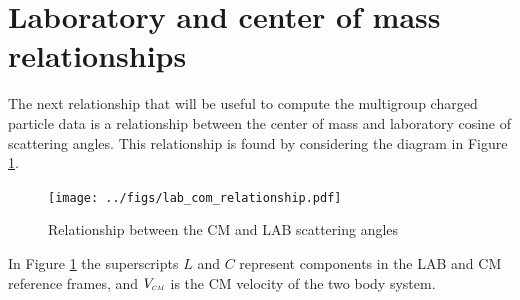 \documentclass[../main.tex]{subfiles}
\begin{document}
\section{Laboratory and center of mass relationships}
The next relationship that will be useful to compute the multigroup charged particle data is a relationship between the center of mass and laboratory cosine of scattering angles. This relationship is found by considering the diagram in Figure \ref{fig:lab_com_rel}.
\begin{figure}[!htb]
  \centering
  \texttt{[image: ../figs/lab\_com\_relationship.pdf]}
  \caption{Relationship between the CM and LAB scattering angles}
  \label{fig:lab_com_rel}
\end{figure}
In Figure \ref{fig:lab_com_rel} the superscripts $L$ and $C$ represent components in the LAB and CM reference frames, and $V_{\scaleto{CM}{3pt}}$ is the CM velocity of the two body system.
\end{document}
